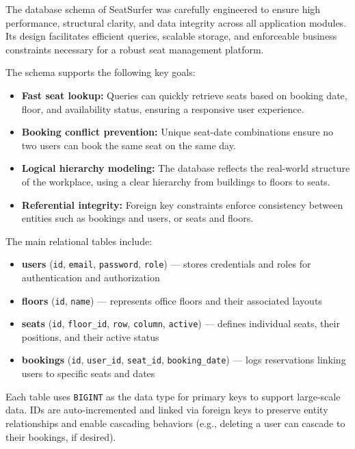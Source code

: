 \documentclass[12pt,a4paper]{report} %
\begin{document}
The database schema of SeatSurfer was carefully engineered to ensure high performance, structural clarity, and data integrity across all application modules. Its design facilitates efficient queries, scalable storage, and enforceable business constraints necessary for a robust seat management platform.

The schema supports the following key goals:
\begin{itemize}
    \item \textbf{Fast seat lookup:} Queries can quickly retrieve seats based on booking date, floor, and availability status, ensuring a responsive user experience.
    \item \textbf{Booking conflict prevention:} Unique seat-date combinations ensure no two users can book the same seat on the same day.
    \item \textbf{Logical hierarchy modeling:} The database reflects the real-world structure of the workplace, using a clear hierarchy from buildings to floors to seats.
    \item \textbf{Referential integrity:} Foreign key constraints enforce consistency between entities such as bookings and users, or seats and floors.
\end{itemize}

The main relational tables include:

\begin{itemize}
    \item \textbf{users} (\texttt{id}, \texttt{email}, \texttt{password}, \texttt{role}) — stores credentials and roles for authentication and authorization
    \item \textbf{floors} (\texttt{id}, \texttt{name}) — represents office floors and their associated layouts
    \item \textbf{seats} (\texttt{id}, \texttt{floor\_id}, \texttt{row}, \texttt{column}, \texttt{active}) — defines individual seats, their positions, and their active status
    \item \textbf{bookings} (\texttt{id}, \texttt{user\_id}, \texttt{seat\_id}, \texttt{booking\_date}) — logs reservations linking users to specific seats and dates
\end{itemize}

Each table uses \texttt{BIGINT} as the data type for primary keys to support large-scale data. IDs are auto-incremented and linked via foreign keys to preserve entity relationships and enable cascading behaviors (e.g., deleting a user can cascade to their bookings, if desired).
\end{document}
